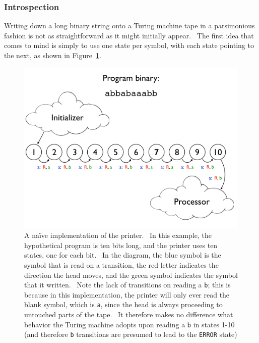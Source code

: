 \documentclass[11pt]{article}
\begin{document}
\subsubsection{Introspection}

Writing down a long binary string onto a Turing machine tape in a parsimonious fashion is not as straightforward as it might initially appear. \ The first idea that comes to mind is simply to use one state per symbol, with each state pointing to the next, as shown in Figure~\ref{fig:naiveprog}.

\begin{figure}
\begin{center}
\includegraphics[scale=0.28]{figs/naiveprog.png}
\caption{A na\"ive implementation of the printer. \ In this example, the hypothetical program is ten bits long, and the printer uses ten states, one for each bit. \ In the diagram, the blue symbol is the symbol that is read on a transition, the red letter indicates the direction the head moves, and the green symbol indicates the symbol that it written. \ Note the lack of transitions on reading a \texttt{b}; this is because in this implementation, the printer will only ever read the blank symbol, which is \texttt{a}, since the head is always proceeding to untouched parts of the tape. \ It therefore makes no difference what behavior the Turing machine adopts upon reading a \texttt{b} in states 1-10 (and therefore \texttt{b} transitions are presumed to lead to the \texttt{ERROR} state) \label{fig:naiveprog}}

\end{center}
\end{figure}
\end{document}
